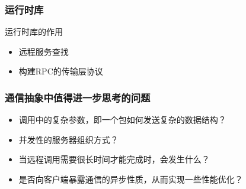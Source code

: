 \begin{frame}[fragile]
    \frametitle{运行时库}
    运行时库的作用
  
    \begin{itemize}
        \item 远程服务查找
        \item 构建RPC的传输层协议        
    \end{itemize}
\end{frame}

\begin{frame}[fragile]
    \frametitle{通信抽象中值得进一步思考的问题}

    \begin{itemize}
        \item 调用中的复杂参数，即一个包如何发送复杂的数据结构？
        \item 并发性的服务器组织方式？
        \item 当远程调用需要很长时间才能完成时，会发生什么？
        \item 是否向客户端暴露通信的异步性质，从而实现一些性能优化？
    \end{itemize}
\end{frame}

